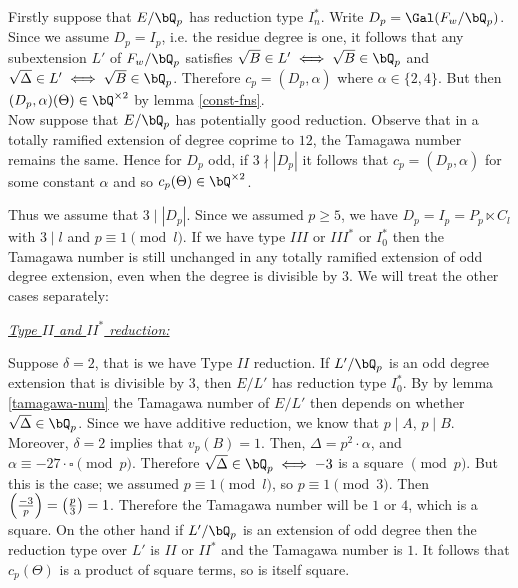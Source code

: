 \vspace{2em}

Firstly suppose that $E / \bQ_p$ has reduction type $I_{n}^{*}$. 
Write $D_p = \Gal(F_w / \bQ_p)$. Since we assume $D_p = I_p$, i.e. the residue degree is one, it follows that any subextension $L'$ of $F_{w} / \bQ_p$ satisfies $\sqrt{B} \in L' \iff \sqrt{B} \in \bQ_p$ and $\sqrt{\Delta} \in L' \iff \sqrt{B} \in \bQ_p$. 
Therefore $c_p = (D_p, \alpha)$ where $\alpha \in \{2, 4\}$. But then $(D_p, \alpha)(\Theta) \in \bQ^{\times 2}$ by lemma \ref{const-fns}.\\

Now suppose that $E / \bQ_p$ has potentially good reduction. Observe that in a totally ramified extension of degree coprime to $12$, the Tamagawa number remains the same. Hence for $D_p$ odd, if $3 \nmid |D_p|$ it follows that $c_p = (D_p, \alpha)$ for some constant $
\alpha$ and so $c_p(\Theta) \in \bQ^{\times 2}$.

Thus we assume that $3 \mid |D_p|$. Since we assumed $p \geq 5$, we have $D_p = I_p = P_p \ltimes C_l$ with $3 \mid l$ and $p \equiv 1 \pmod l$. 
If we have type $III$ or $III^*$ or $I_0^*$ then the Tamagawa number is still unchanged in any totally ramified extension of odd degree extension, even when the degree is divisible by $3$. We will treat the other cases separately: 

\vspace{1em}

\noindent\underline{\textit{Type $II$ and $II^*$ reduction:}}

Suppose $\delta = 2$, that is we have Type $II$ reduction. If $L' / \bQ_p$ is an odd degree extension that is divisible by $3$, then $E / L'$ has reduction type $I_0^*$. By by lemma \ref{tamagawa-num} the Tamagawa number of $E / L'$ then depends on whether $\sqrt{\Delta} \in \bQ_p$. Since we have additive reduction, we know that $p \mid A$, $p \mid B$. Moreover, $\delta = 2$ implies that $v_p(B) = 1$. Then, $\Delta = p^2\cdot \alpha$, and $\alpha \equiv -27\cdot\square \pmod p$. Therefore $\sqrt{\Delta} \in \bQ_p \iff -3$ is a square $\pmod p$. But this is the case; we assumed $p \equiv 1 \pmod l$, so $p \equiv 1 \pmod 3$. Then $\left( \frac{-3}{p} \right)  = \left( \frac{p}{3} \right)  = 1$. Therefore the Tamagawa number will be $1$ or $4$, which is a square.
On the other hand if $L' / \bQ_p$ is an extension of odd degree then the reduction type over $L'$ is $II$ or $II^*$ and the Tamagawa number is $1$. It follows that $c_p(\Theta)$ is a product of square terms, so is itself square. 

